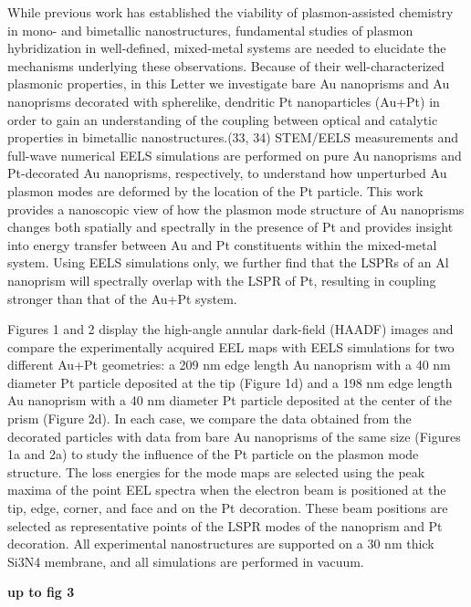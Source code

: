 \documentclass [11pt, proquest] {uwthesis}[2016/11/22]
\begin{document}
While previous work has established the viability of plasmon-assisted chemistry in mono- and bimetallic nanostructures, fundamental studies of plasmon hybridization in well-defined, mixed-metal systems are needed to elucidate the mechanisms underlying these observations. Because of their well-characterized plasmonic properties, in this Letter we investigate bare Au nanoprisms and Au nanoprisms decorated with spherelike, dendritic Pt nanoparticles (Au+Pt) in order to gain an understanding of the coupling between optical and catalytic properties in bimetallic nanostructures.(33, 34) STEM/EELS measurements and full-wave numerical EELS simulations are performed on pure Au nanoprisms and Pt-decorated Au nanoprisms, respectively, to understand how unperturbed Au plasmon modes are deformed by the location of the Pt particle. This work provides a nanoscopic view of how the plasmon mode structure of Au nanoprisms changes both spatially and spectrally in the presence of Pt and provides insight into energy transfer between Au and Pt constituents within the mixed-metal system. Using EELS simulations only, we further find that the LSPRs of an Al nanoprism will spectrally overlap with the LSPR of Pt, resulting in coupling stronger than that of the Au+Pt system.

Figures 1 and 2 display the high-angle annular dark-field (HAADF) images and compare the experimentally acquired EEL maps with EELS simulations for two different Au+Pt geometries: a 209 nm edge length Au nanoprism with a 40 nm diameter Pt particle deposited at the tip (Figure 1d) and a 198 nm edge length Au nanoprism with a 40 nm diameter Pt particle deposited at the center of the prism (Figure 2d). In each case, we compare the data obtained from the decorated particles with data from bare Au nanoprisms of the same size (Figures 1a and 2a) to study the influence of the Pt particle on the plasmon mode structure. The loss energies for the mode maps are selected using the peak maxima of the point EEL spectra when the electron beam is positioned at the tip, edge, corner, and face and on the Pt decoration. These beam positions are selected as representative points of the LSPR modes of the nanoprism and Pt decoration. All experimental nanostructures are supported on a 30 nm thick Si3N4 membrane, and all simulations are performed in vacuum.

{\bf up to fig 3}
\end{document}
